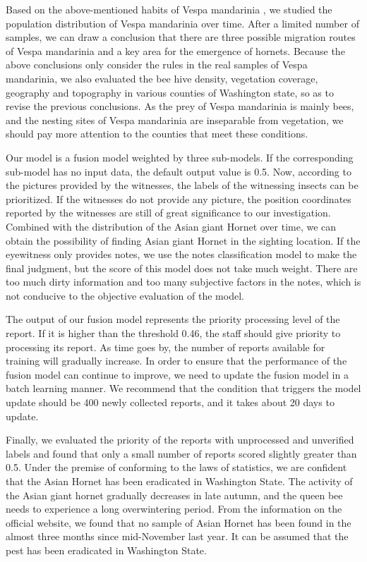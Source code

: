 \documentclass{mcmthesis}
\numberwithin{figure}{section}
\numberwithin{table}{section}
\begin{document}
Based on the above-mentioned habits of Vespa mandarinia , we studied the population distribution of Vespa mandarinia  over time. After a limited number of samples, we can draw a conclusion that there are three possible migration routes of Vespa mandarinia  and a key area for the emergence of hornets. Because the above conclusions only consider the rules in the real samples of Vespa mandarinia, we also evaluated the bee hive density, vegetation coverage, geography and topography in various counties of Washington state, so as to revise the previous conclusions. As the prey of Vespa mandarinia is mainly bees, and the nesting sites of Vespa mandarinia  are inseparable from vegetation, we should pay more attention to the counties that meet these conditions.

Our model is a fusion model weighted by three sub-models. If the corresponding sub-model has no input data, the default output value is 0.5. Now, according to the pictures provided by the witnesses, the labels of the witnessing insects can be prioritized. If the witnesses do not provide any picture, the position coordinates reported by the witnesses are still of great significance to our investigation. Combined with the distribution of the Asian giant Hornet over time, we can obtain the possibility of finding Asian giant Hornet in the sighting location. If the eyewitness only provides notes, we use the notes classification model to make the final judgment, but the score of this model does not take much weight. There are too much dirty information and too many subjective factors in the notes, which is not conducive to the objective evaluation of the model.

The output of our fusion model represents the priority processing level of the report. If it is higher than the threshold 0.46, the staff should give priority to processing its report. As time goes by, the number of reports available for training will gradually increase. In order to ensure that the performance of the fusion model can continue to improve, we need to update the fusion model in a batch learning manner. We recommend that the condition that triggers the model update should be 400 newly collected reports, and it takes about 20 days to update.

Finally, we evaluated the priority of the reports with unprocessed and unverified labels and found that only a small number of reports scored slightly greater than 0.5. Under the premise of conforming to the laws of statistics, we are confident that the Asian Hornet has been eradicated in Washington State. The activity of the Asian giant hornet gradually decreases in late autumn, and the queen bee needs to experience a long overwintering period. From the information on the official website, we found that no sample of Asian Hornet has been found in the almost three months since mid-November last year. It can be assumed that the pest has been eradicated in Washington State.


\newpage
{}


\end{document}
